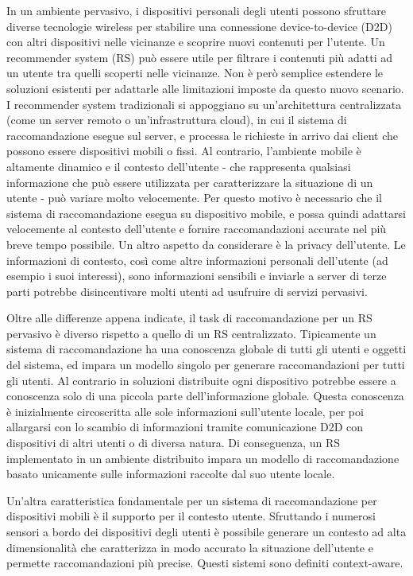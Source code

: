 \documentclass[12pt,italian]{report}
\begin{document}
In un ambiente pervasivo, i dispositivi personali degli utenti possono sfruttare diverse tecnologie wireless per stabilire una connessione device-to-device (D2D) con altri dispositivi nelle vicinanze e scoprire nuovi contenuti per l'utente. Un recommender system (RS) può essere utile per filtrare i contenuti più adatti ad un utente tra quelli 
scoperti nelle vicinanze. Non è però semplice estendere le soluzioni esistenti per adattarle alle 
limitazioni imposte da questo nuovo scenario. I recommender system tradizionali si appoggiano su un'architettura centralizzata (come  un server remoto o un'infrastruttura cloud), in cui il sistema di raccomandazione esegue sul server, e processa le richieste in arrivo dai client che possono essere dispositivi mobili o fissi. 
Al contrario, l'ambiente mobile è altamente dinamico e il contesto dell'utente - che rappresenta qualsiasi informazione che può essere utilizzata per caratterizzare la situazione di un utente - può  variare molto velocemente. Per questo motivo è necessario che il sistema di raccomandazione esegua su dispositivo mobile, e possa quindi adattarsi velocemente al contesto dell'utente e fornire raccomandazioni accurate nel più breve tempo possibile. Un altro aspetto da considerare è la privacy dell'utente. Le informazioni di contesto, così come altre informazioni personali dell'utente (ad esempio i suoi interessi), sono informazioni sensibili e inviarle a server di terze parti potrebbe disincentivare molti utenti ad usufruire di servizi pervasivi.

Oltre alle differenze appena indicate, il task di raccomandazione per un RS pervasivo è diverso rispetto a quello di un RS centralizzato. Tipicamente un sistema di raccomandazione ha una conoscenza globale di tutti gli utenti e oggetti del sistema, ed impara un modello singolo per generare raccomandazioni per tutti gli utenti. Al contrario in soluzioni distribuite ogni dispositivo potrebbe
essere a conoscenza solo di una piccola parte dell'informazione globale. Questa conoscenza è inizialmente 
circoscritta alle sole informazioni sull'utente locale, per poi allargarsi con lo scambio di informazioni 
tramite comunicazione D2D con dispositivi di altri utenti o di diversa natura. Di conseguenza, 
un RS implementato in un ambiente distribuito impara un modello di raccomandazione basato unicamente 
sulle informazioni raccolte dal suo utente locale. 

Un'altra caratteristica fondamentale per un sistema di raccomandazione per dispositivi mobili è il 
supporto per il contesto utente. Sfruttando i numerosi sensori a bordo dei dispositivi degli utenti è possibile 
generare un contesto ad alta dimensionalità che caratterizza in modo accurato la situazione dell'utente e permette raccomandazioni più precise. Questi sistemi sono definiti context-aware.
\end{document}
